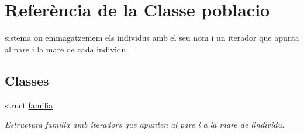 \hypertarget{classpoblacio}{}\section{Referència de la Classe poblacio}
\label{classpoblacio}


sistema on emmagatzemem els individus amb el seu nom i un iterador que apunta al pare i la mare de cada individu.  


\subsection*{Classes}
\begin{DoxyCompactItemize}
\item 
struct \hyperlink{structpoblacio_1_1familia}{familia}
\begin{DoxyCompactList}\small\item\em Estructura familia amb iteradors que apunten al pare i a la mare de l\textquotesingle{}individu. \end{DoxyCompactList}\end{DoxyCompactItemize}
